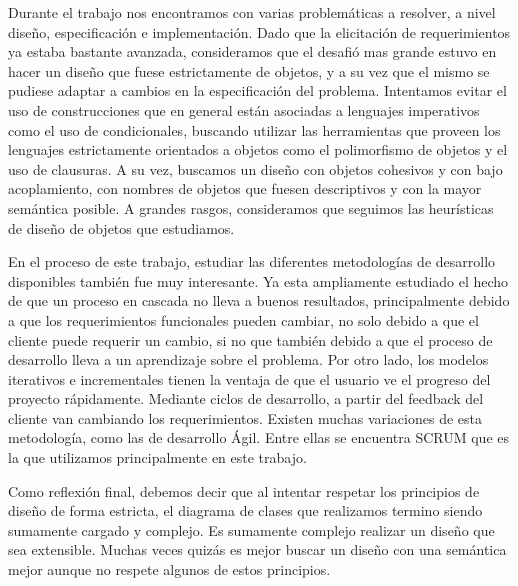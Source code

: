 \documentclass[10pt,a4paper]{article}
\begin{document}
Durante el trabajo nos encontramos con varias problemáticas a resolver, a nivel diseño, especificación e implementación. Dado que la elicitación de requerimientos ya estaba bastante avanzada, consideramos que el desafió mas grande estuvo en hacer un diseño que fuese estrictamente de objetos, y a su vez que el mismo se pudiese adaptar a cambios en la especificación del problema. Intentamos evitar el uso de construcciones que en general están asociadas a lenguajes imperativos como el uso de condicionales, buscando utilizar las herramientas que proveen los lenguajes estrictamente orientados a objetos como el polimorfismo de objetos y el uso de clausuras. A su vez, buscamos un diseño con objetos cohesivos y con bajo acoplamiento, con nombres de objetos que fuesen descriptivos y con la mayor semántica posible. A grandes rasgos, consideramos que seguimos las heurísticas de diseño de objetos que estudiamos.

En el proceso de este trabajo, estudiar las diferentes metodologías de desarrollo disponibles también fue muy interesante. Ya esta ampliamente estudiado el hecho de que un proceso en cascada no lleva a buenos resultados, principalmente debido a que los requerimientos funcionales pueden cambiar, no solo debido a que el cliente puede requerir un cambio, si no que también debido a que el proceso de desarrollo lleva a un aprendizaje sobre el problema. Por otro lado, los modelos iterativos e incrementales tienen la ventaja de que el usuario ve el progreso del proyecto rápidamente. Mediante ciclos de desarrollo, a partir del feedback del cliente van cambiando los requerimientos. Existen muchas variaciones de esta metodología, como las de desarrollo Ágil. Entre ellas se encuentra SCRUM que es la que utilizamos principalmente en este trabajo.

Como reflexión final, debemos decir que al intentar respetar los principios de diseño de forma estricta, el diagrama de clases que realizamos termino siendo sumamente cargado y complejo. Es sumamente complejo realizar un diseño que sea extensible. Muchas veces quizás es mejor buscar un diseño con una semántica mejor aunque no respete algunos de estos principios.
\end{document}
